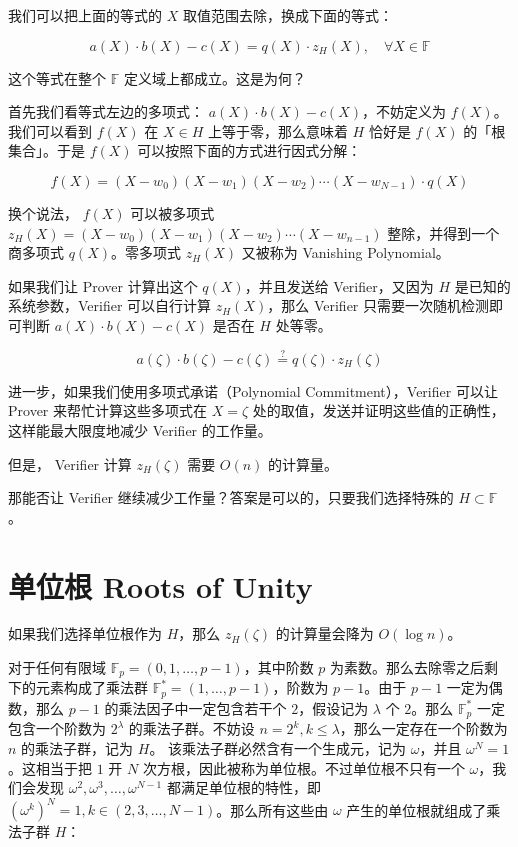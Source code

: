 我们可以把上面的等式的 \(X\) 取值范围去除，换成下面的等式：

\[
a(X)\cdot b(X) - c(X) = q(X)\cdot z_H(X), \quad\forall X\in \mathbb{F}
\]

这个等式在整个 \(\mathbb{F}\) 定义域上都成立。这是为何？

首先我们看等式左边的多项式： \(a(X)\cdot b(X)-c(X)\)，不妨定义为
\(f(X)\)。我们可以看到 \(f(X)\) 在 \(X\in H\) 上等于零，那么意味着 \(H\)
恰好是 \(f(X)\) 的「根集合」。于是 \(f(X)\)
可以按照下面的方式进行因式分解：

\[
f(X)=(X-w_0)(X-w_1)(X-w_2)\cdots(X-w_{N-1})\cdot q(X)
\]

换个说法， \(f(X)\) 可以被多项式
\(z_H(X)=(X-w_0)(X-w_1)(X-w_2)\cdots(X-w_{n-1})\)
整除，并得到一个商多项式 \(q(X)\)。零多项式 \(z_H(X)\) 又被称为
Vanishing Polynomial。

如果我们让 Prover 计算出这个 \(q(X)\)，并且发送给 Verifier，又因为 \(H\)
是已知的系统参数，Verifier 可以自行计算 \(z_H(X)\)，那么 Verifier
只需要一次随机检测即可判断 \(a(X)\cdot b(X)-c(X)\) 是否在 \(H\) 处等零。

\[
a(\zeta)\cdot b(\zeta)-c(\zeta) \overset{?}{=} q(\zeta)\cdot z_H(\zeta)
\]

进一步，如果我们使用多项式承诺（Polynomial Commitment），Verifier 可以让
Prover 来帮忙计算这些多项式在 \(X=\zeta\)
处的取值，发送并证明这些值的正确性，这样能最大限度地减少 Verifier
的工作量。

但是， Verifier 计算 \(z_H(\zeta)\) 需要 \(O(n)\) 的计算量。

那能否让 Verifier 继续减少工作量？答案是可以的，只要我们选择特殊的
\(H\subset \mathbb{F}\) 。

\hypertarget{ux5355ux4f4dux6839-roots-of-unity}{%
\section{单位根 Roots of
Unity}\label{ux5355ux4f4dux6839-roots-of-unity}}

如果我们选择单位根作为 \(H\)，那么 \(z_H(\zeta)\) 的计算量会降为
\(O(\log{n})\)。

对于任何有限域 \(\mathbb{F}_p=(0,1,\ldots,p-1)\)，其中阶数 \(p\)
为素数。那么去除零之后剩下的元素构成了乘法群
\(\mathbb{F}_p^\ast=(1,\ldots,p-1)\)，阶数为 \(p-1\)。由于 \(p-1\)
一定为偶数，那么 \(p-1\) 的乘法因子中一定包含若干个 \(2\)，假设记为
\(\lambda\) 个 \(2\)。那么 \(\mathbb{F}_p^\ast\) 一定包含一个阶数为
\(2^\lambda\) 的乘法子群。不妨设
\(n=2^{k}, k\leq\lambda\)，那么一定存在一个阶数为 \(n\) 的乘法子群，记为
\(H\)。 该乘法子群必然含有一个生成元，记为 \(\omega\)，并且
\(\omega^N=1\)。这相当于把 \(1\) 开 \(N\)
次方根，因此被称为单位根。不过单位根不只有一个 \(\omega\)，我们会发现
\(\omega^2,\omega^3,\ldots,\omega^{N-1}\) 都满足单位根的特性，即
\((\omega^k)^N=1, k\in(2,3,\ldots,N-1)\)。那么所有这些由 \(\omega\)
产生的单位根就组成了乘法子群 \(H\)：


